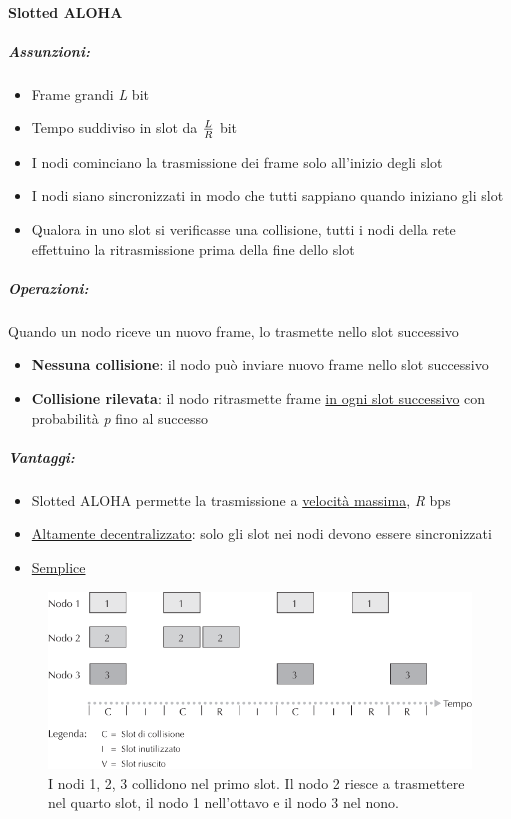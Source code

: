 \documentclass[12pt]{article}
\begin{document}
    \paragraph{Slotted ALOHA}
    \subparagraph{Assunzioni:}
    \begin{itemize}
        \item Frame grandi \textit{L} bit
        \item Tempo suddiviso in slot da $L \over R$ bit
        \item I nodi cominciano la trasmissione dei frame solo all'inizio degli slot
        \item I nodi siano sincronizzati in modo che tutti sappiano quando iniziano gli slot
        \item Qualora in uno slot si verificasse una collisione, tutti i nodi della rete effettuino la ritrasmissione prima della fine dello slot
    \end{itemize}
    \subparagraph{Operazioni:} Quando un nodo riceve un nuovo frame, lo trasmette nello slot successivo
    \begin{itemize}
        \item \textbf{Nessuna collisione}: il nodo può inviare nuovo frame nello slot successivo
        \item \textbf{Collisione rilevata}: il nodo ritrasmette frame \underline{in ogni slot successivo} con probabilità \textit{p} fino al successo
    \end{itemize}
    \subparagraph{Vantaggi:}
    \begin{itemize}
        \item Slotted ALOHA permette la trasmissione a \underline{velocità massima}, \textit{R} bps
        \item \underline{Altamente decentralizzato}: solo gli slot nei nodi devono essere sincronizzati
        \item \underline{Semplice}
    \end{itemize}
    \begin{figure}[!htb]
        \centering
        \includegraphics[width=1\textwidth]{slottedaloha.png}
        \caption{I nodi 1, 2, 3 collidono nel primo slot. Il nodo 2 riesce a trasmettere nel quarto slot, il nodo 1 nell'ottavo e il nodo 3 nel nono.}
    \end{figure}
    \FloatBarrier
    
\end{document}
